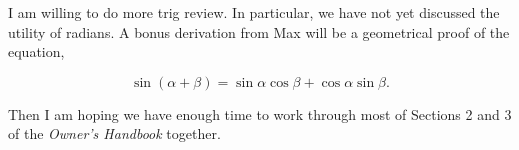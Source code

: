 \bigskip

\nobreak\bigskip

\noindent I am willing to do more trig review. In particular, we have not yet discussed the utility of radians. A bonus derivation from Max will be a geometrical proof of the equation,

$$\sin(\alpha + \beta) = \sin \alpha \cos \beta + \cos \alpha \sin \beta.$$

\noindent Then I am hoping we have enough time to work through most of Sections 2 and 3 of the {\it Owner's Handbook} together.

\noindent 
\bye
